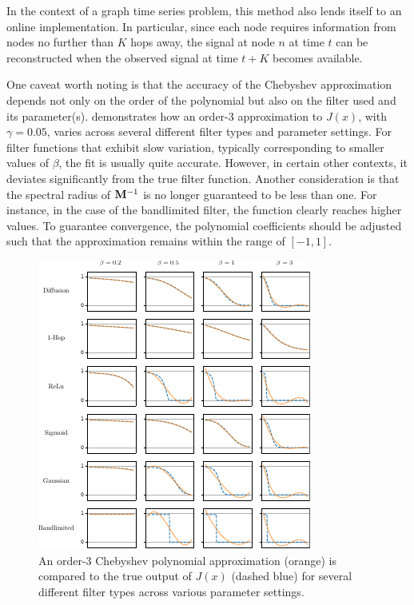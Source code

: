 In the context of a graph time series problem, this method also lends itself to an online implementation. In particular, since each node requires information from nodes no further than $K$ hops away, the signal at node $n$ at time $t$ can be reconstructed when the observed signal at time $t+K$ becomes available. 

One caveat worth noting is that the accuracy of the Chebyshev approximation depends not only on the order of the polynomial but also on the filter used and its parameter(s).  demonstrates how an order-3 approximation to $J(x)$, with $\gamma=0.05$, varies across several different filter types and parameter settings. For filter functions that exhibit slow variation, typically corresponding to smaller values of $\beta$, the fit is usually quite accurate. However, in certain other contexts, it deviates significantly from the true filter function. Another consideration is that the spectral radius of $\mathbf{M}^{-1}$ is no longer guaranteed to be less than one. For instance, in the case of the bandlimited filter, the function clearly reaches higher values. To guarantee convergence, the polynomial coefficients should be adjusted such that the approximation remains within the range of $[-1, 1]$. 

\vspace{0.5cm}

\begin{figure}[t]
    \hspace{0.2cm}
        \includegraphics[width=0.9\linewidth]{Figures/cheb_approx.pdf}
    \caption[Chebyshev approximation accuracy visualisation]{\small{An order-3 Chebyshev polynomial approximation (orange) is compared to the true output of $J(x)$ (dashed blue) for several different filter types across various parameter settings. }}
    \label{fig:cheb_approx}
\end{figure}



